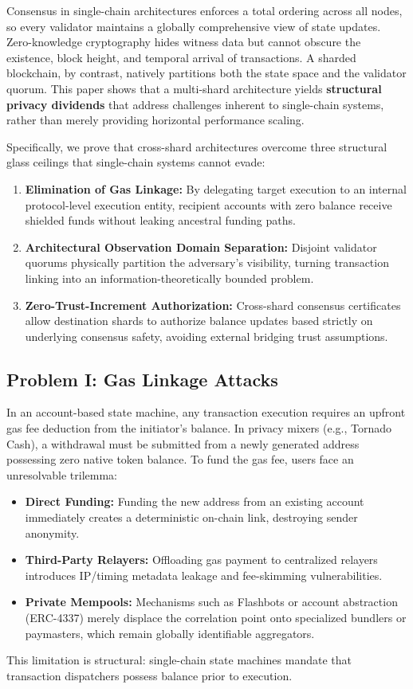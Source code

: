 \documentclass[sigconf,nonacm]{acmart}
\begin{document}
Consensus in single-chain architectures enforces a total ordering across all nodes, so every validator maintains a globally comprehensive view of state updates. Zero-knowledge cryptography hides witness data but cannot obscure the existence, block height, and temporal arrival of transactions. A sharded blockchain, by contrast, natively partitions both the state space and the validator quorum. This paper shows that a multi-shard architecture yields \textbf{structural privacy dividends} that address challenges inherent to single-chain systems, rather than merely providing horizontal performance scaling.

Specifically, we prove that cross-shard architectures overcome three structural glass ceilings that single-chain systems cannot evade:
\begin{enumerate}
    \item \textbf{Elimination of Gas Linkage:} By delegating target execution to an internal protocol-level execution entity, recipient accounts with zero balance receive shielded funds without leaking ancestral funding paths.
    \item \textbf{Architectural Observation Domain Separation:} Disjoint validator quorums physically partition the adversary's visibility, turning transaction linking into an information-theoretically bounded problem.
    \item \textbf{Zero-Trust-Increment Authorization:} Cross-shard consensus certificates allow destination shards to authorize balance updates based strictly on underlying consensus safety, avoiding external bridging trust assumptions.
\end{enumerate}

\subsection{Problem I: Gas Linkage Attacks}
In an account-based state machine, any transaction execution requires an upfront gas fee deduction from the initiator's balance. In privacy mixers (e.g., Tornado Cash), a withdrawal must be submitted from a newly generated address possessing zero native token balance. To fund the gas fee, users face an unresolvable trilemma:
\begin{itemize}
    \item \textbf{Direct Funding:} Funding the new address from an existing account immediately creates a deterministic on-chain link, destroying sender anonymity.
    \item \textbf{Third-Party Relayers:} Offloading gas payment to centralized relayers introduces IP/timing metadata leakage and fee-skimming vulnerabilities.
    \item \textbf{Private Mempools:} Mechanisms such as Flashbots or account abstraction (ERC-4337) merely displace the correlation point onto specialized bundlers or paymasters, which remain globally identifiable aggregators.
\end{itemize}
This limitation is structural: single-chain state machines mandate that transaction dispatchers possess balance prior to execution.
\end{document}
